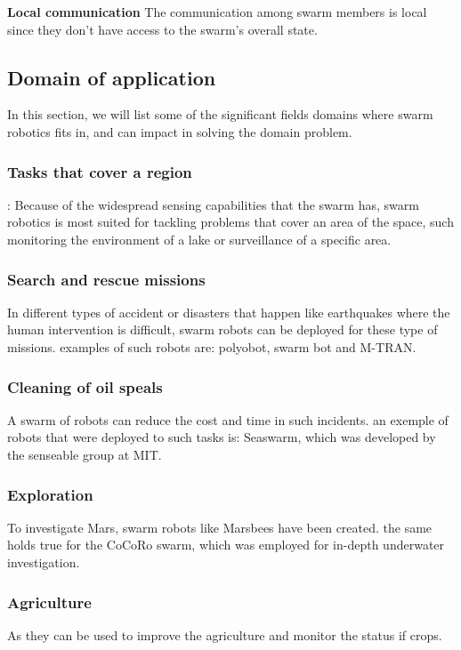 \documentclass[12pt]{article}
\begin{document}
\textbf{Local communication} The communication among swarm members is local since they don't have access to  the swarm's overall state.
\cite{brambilla2013swarm}\cite{olaronke2020systematic} 

  

\subsection{Domain of application}
In this section, we will list some of the significant fields domains where swarm robotics fits in, and can impact in solving the domain problem.\newpage
\subsubsection{Tasks that cover a region}:
Because of the widespread sensing capabilities that the swarm has, swarm robotics is most suited for tackling problems that cover an area of the space, such monitoring the environment of a lake or  surveillance of a specific area.\cite{csahin2005swarm}\cite{olaronke2020systematic}

\subsubsection{Search and rescue missions}
In different types of accident or disasters that happen like earthquakes where the human intervention is difficult, swarm robots can be deployed for these type of missions. examples of such robots are: polyobot, swarm bot and M-TRAN.

\subsubsection{Cleaning of oil speals}
A swarm of robots can reduce the cost and time in such incidents. an exemple of robots that were deployed to such tasks is: Seaswarm, which was developed by the senseable group at MIT.

\subsubsection{Exploration}
To investigate Mars, swarm robots like Marsbees have been created. the same holds true for the CoCoRo swarm, which was employed for in-depth underwater investigation.
\subsubsection{Agriculture}
As they can be used to improve the agriculture and monitor the status if crops. 
\end{document}

